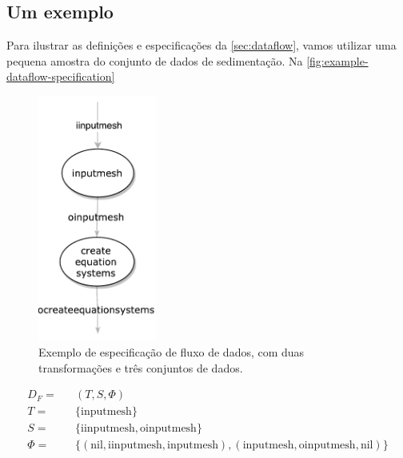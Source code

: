 \subsection{Um exemplo}%
\label{sec:um-exemplo-de-dataflow}

Para ilustrar as definições e especificações da \autoref{sec:dataflow}, vamos utilizar uma pequena amostra do conjunto de dados de sedimentação. Na \autoref{fig:example-dataflow-specification} 

\begin{figure}[ht]
    \centering
    \includegraphics[width=0.35\textwidth]{img/example-dataflow-specification}
    \caption[Exemplo de especificação de fluxo de dados]{Exemplo de especificação de fluxo de dados, com duas transformações e três conjuntos de dados.}%
    \label{fig:example-dataflow-specification}
\end{figure}


\[
\begin{aligned}
D_F = && (T, S, \Phi) \\
T = && \{ \textrm{inputmesh} \} \\
S = && \{ \textrm{iinputmesh}, \textrm{oinputmesh} \} \\
\Phi = && \{ (\textrm{nil}, \textrm{iinputmesh}, \textrm{inputmesh}),
(\textrm{inputmesh}, \textrm{oinputmesh}, \textrm{nil})
\} \\
\end{aligned}
\]


